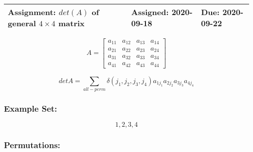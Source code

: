 \documentclass[a4paper,11pt,twoside]{report}
\begin{document}
 
\begin{table}[htpb]
	\centering
	\large
	\begin{tabular}{| p{7.6cm} | p{3.9cm} | p{3cm} |}
		\hline
		Assignment: $det(A)$ of general $4\times 4$ matrix &	Assigned: 2020-09-18   & Due: 2020-09-22 \\
	\hline
	\end{tabular}
\end{table}
\small

\[A = \begin{bmatrix} a_{11} & a_{12} & a_{13} & a_{14}\\
a_{21} & a_{22} & a_{23} & a_{24} \\
a_{31} & a_{32} & a_{33} & a_{34} \\
a_{41} & a_{42} & a_{43} & a_{44}
\end{bmatrix} \]

\[detA = \sum_{all-perm}^{} \delta(j_1,j_2,j_3,j_4)a_{1j_{1}}a_{2j_{2}}a_{3j_{3}}a_{4j_{4}}\]

\subsubsection{Example Set:}%
\label{ssub:example_set_}

\[{1,2,3,4}\]

\subsubsection{Permutations:}%
\label{ssub:permutations_}
\end{document}

